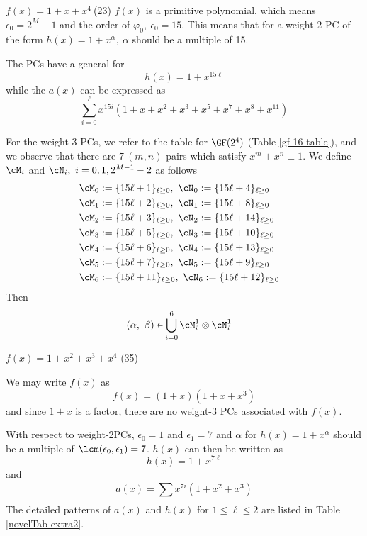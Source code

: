 \begin{example}
	$f(x)= 1+x+x^4~$(23)\newline
	$f(x)$ is a primitive polynomial, which means $\epsilon_0=2^M-1$ and the order of $\varphi_0,~\epsilon_0=15$. This means that for a weight-2 PC of the form $h(x)=1+x^{\alpha},~\alpha$ should be a multiple of 15.
	
	The PCs have a general for
	$$h(x)=1+x^{15\ell}$$
	while the $a(x)$ can be expressed as 
	$$ \sum_{i=0}^{\ell} x^{15i} \left(1 +x +x^2 +x^3+x^5+x^7+x^8+x^{11} \right)$$
	
	
	For the weight-3 PCs, we refer to the table for $\GF(2^4)$ (Table \ref{gf-16-table}), and we observe that there are $7~(m,n)$ pairs which satisfy $x^m+x^n \equiv 1$. We define $\cM_i$ and $\cN_i,~i=0,1,2^{M-1}-2$ as follows
	\begin{align}
		\cM_0 &:= \{15\ell + 1\}_{\ell \geq 0},~\cN_0 := \{15\ell + 4\}_{\ell \geq 0}\cr
		\cM_1 &:= \{15\ell + 2\}_{\ell \geq 0},~\cN_1 := \{15\ell + 8\}_{\ell \geq 0}\cr
		\cM_2 &:= \{15\ell + 3\}_{\ell \geq 0},~\cN_2 := \{15\ell + 14\}_{\ell \geq 0}\cr
		\cM_3 &:= \{15\ell + 5\}_{\ell \geq 0},~\cN_3 := \{15\ell + 10\}_{\ell \geq 0}\cr
		\cM_4 &:= \{15\ell + 6\}_{\ell \geq 0},~\cN_4 := \{15\ell + 13\}_{\ell \geq 0}\cr
		\cM_5 &:= \{15\ell + 7\}_{\ell \geq 0},~\cN_5 := \{15\ell + 9\}_{\ell \geq 0}\cr
		\cM_6 &:= \{15\ell + 11\}_{\ell \geq 0},~\cN_6 := \{15\ell + 12\}_{\ell \geq 0}
	\end{align}
	Then 
	\begin{equation*}
		\begin{split}
			(\alpha,~\beta) \in &\bigcup_{i=0}^6 \cM_i^1\otimes\cN_i^1 
		\end{split}
	\end{equation*}
	
	
\end{example}

\begin{example}
	$f(x)=1+x^2+x^3+x^4$ (35)\newline
	
	We may write $f(x)$ as 
	$$f(x) =(1+x)(1+x+x^3)$$
	and since $1+x$ is a factor, there are no weight-3 PCs associated with $f(x)$.
	
	With respect to weight-2PCs, $\epsilon_0=1$ and $\epsilon_1=7$ and $\alpha$ for $h(x)=1+x^{\alpha}$ should be a multiple of $\lcm(\epsilon_0,\epsilon_1)=7$. $h(x)$ can then be written as 
	$$h(x) =1+x^{7\ell}$$ and 
	$$a(x) = \sum_{}^{}x^{7i}(1+x^2+x^3)$$
	The detailed patterns of $a(x)$ and $h(x)$ for $1 \leq \ell \leq 2$ are listed in Table \ref{novelTab-extra2}.
	
	
\end{example}


